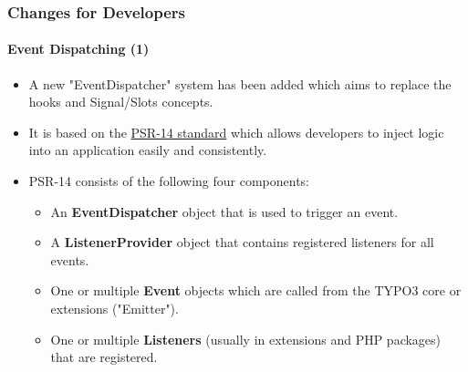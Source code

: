 \begin{frame}[fragile]
	\frametitle{Changes for Developers}
	\framesubtitle{Event Dispatching (1)}

	\begin{itemize}
		\item A new "EventDispatcher" system has been added which aims to replace
			the hooks and Signal/Slots concepts.

		\item It is based on the \href{https://www.php-fig.org/psr/psr-14}{PSR-14 standard}
			which allows developers to inject logic into an application easily and consistently.

		\item PSR-14 consists of the following four components:

			\begin{itemize}
				\item An \textbf{EventDispatcher} object that is used to trigger an event.
				\item A \textbf{ListenerProvider} object that contains registered listeners for all events.
				\item One or multiple \textbf{Event} objects which are called from the TYPO3 core or extensions ("Emitter").
				\item One or multiple \textbf{Listeners} (usually in extensions and PHP packages) that are registered.
			\end{itemize}


	\end{itemize}

\end{frame}


